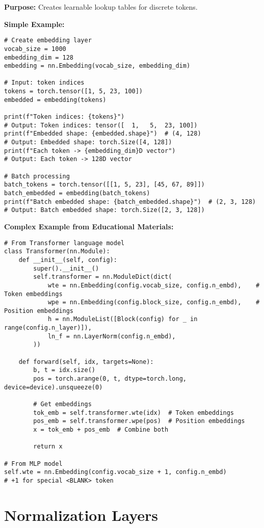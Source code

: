 \documentclass[11pt,a4paper]{book}
\begin{document}
\textbf{Purpose:} Creates learnable lookup tables for discrete tokens.

\textbf{Simple Example:}
\begin{verbatim}
# Create embedding layer
vocab_size = 1000
embedding_dim = 128
embedding = nn.Embedding(vocab_size, embedding_dim)

# Input: token indices
tokens = torch.tensor([1, 5, 23, 100])
embedded = embedding(tokens)

print(f"Token indices: {tokens}")
# Output: Token indices: tensor([  1,   5,  23, 100])
print(f"Embedded shape: {embedded.shape}")  # (4, 128)
# Output: Embedded shape: torch.Size([4, 128])
print(f"Each token -> {embedding_dim}D vector")
# Output: Each token -> 128D vector

# Batch processing
batch_tokens = torch.tensor([[1, 5, 23], [45, 67, 89]])
batch_embedded = embedding(batch_tokens)
print(f"Batch embedded shape: {batch_embedded.shape}")  # (2, 3, 128)
# Output: Batch embedded shape: torch.Size([2, 3, 128])
\end{verbatim}

\textbf{Complex Example from Educational Materials:}
\begin{verbatim}
# From Transformer language model
class Transformer(nn.Module):
    def __init__(self, config):
        super().__init__()
        self.transformer = nn.ModuleDict(dict(
            wte = nn.Embedding(config.vocab_size, config.n_embd),    # Token embeddings
            wpe = nn.Embedding(config.block_size, config.n_embd),    # Position embeddings
            h = nn.ModuleList([Block(config) for _ in range(config.n_layer)]),
            ln_f = nn.LayerNorm(config.n_embd),
        ))
    
    def forward(self, idx, targets=None):
        b, t = idx.size()
        pos = torch.arange(0, t, dtype=torch.long, device=device).unsqueeze(0)
        
        # Get embeddings
        tok_emb = self.transformer.wte(idx)  # Token embeddings
        pos_emb = self.transformer.wpe(pos)  # Position embeddings
        x = tok_emb + pos_emb  # Combine both
        
        return x

# From MLP model
self.wte = nn.Embedding(config.vocab_size + 1, config.n_embd)
# +1 for special <BLANK> token
\end{verbatim}

\section{Normalization Layers}
\end{document}
